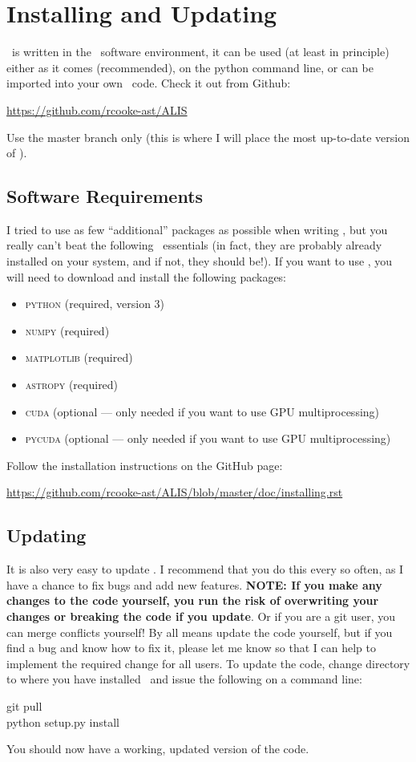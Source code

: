 \section{Installing and Updating \alis}

\alis\ is written in the \python\ software environment,
it can be used (at least in principle) either as it comes
(recommended), on the python command line, or can be
imported into your own \python\ code. Check it out from
Github:

\vspace{0.2cm}
\url{https://github.com/rcooke-ast/ALIS}
\vspace{0.2cm}

Use the master branch only (this is where I will place the most up-to-date version of \alis).

\subsection{Software Requirements}
I tried to use as few ``additional'' packages as possible
when writing \alis, but you really can't beat the following
\python\ essentials (in fact, they are probably already
installed on your system, and if not, they should be!).
If you want to use \alis, you will need to download and
install the following packages:

\begin{itemize}
\item \textsc{python} (required, version $3$)
\item \textsc{numpy} (required)
\item \textsc{matplotlib} (required)
\item \textsc{astropy} (required)
\item \textsc{cuda} (optional --- only needed if you want to use GPU multiprocessing)
\item \textsc{pycuda} (optional --- only needed if you want to use GPU multiprocessing)
\end{itemize}

Follow the installation instructions on the GitHub page:

\url{https://github.com/rcooke-ast/ALIS/blob/master/doc/installing.rst}

\subsection{Updating \alis}

It is also very easy to update \alis. I recommend that you
do this every so often, as I have a chance to fix bugs and
add new features. \textbf{NOTE: If you make any changes
to the code yourself, you run the risk of overwriting your
changes or breaking the code if you update}. Or if you are
a git user, you can merge conflicts yourself! By all means
update the code yourself, but if you find a bug and know
how to fix it, please let me know so that I can help to
implement the required change for all users.
To update the code, change directory to where you have
installed \alis\ and issue the following on a command line:

\vspace{0.4cm}
\begin{myenv}
git pull\\
python setup.py install\\
\end{myenv}
\vspace{0.3cm}

You should now have a working, updated version of the code.
